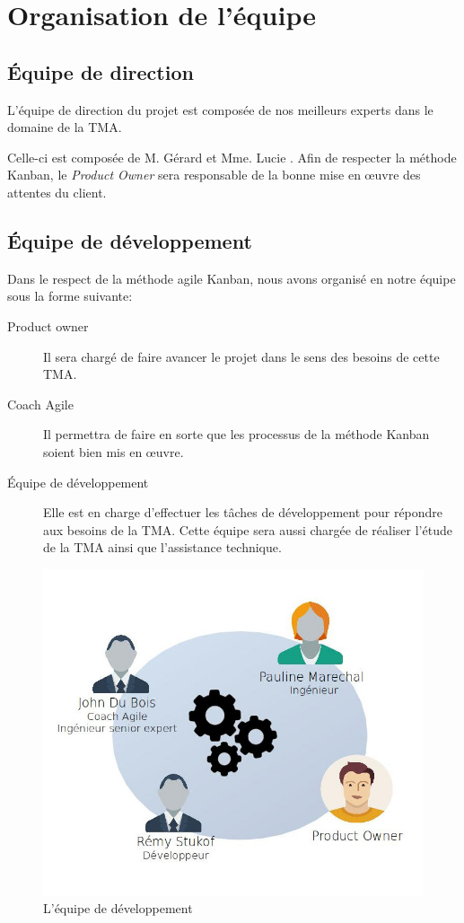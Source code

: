 \section{Organisation de l'équipe}
	\subsection{Équipe de direction}
	L’équipe de direction du projet est composée de nos meilleurs experts dans le domaine de la TMA. 

	Celle-ci est composée de M. Gérard  et Mme. Lucie . Afin de respecter la méthode Kanban, le \textit{Product Owner} sera responsable de la bonne mise en œuvre des attentes du client.
	
	\subsection{Équipe de développement}
	Dans le respect de la méthode agile Kanban, nous avons organisé en notre équipe sous la forme suivante:
	
	\begin{description}
		\item[Product owner]  Il sera chargé de faire avancer le projet dans le sens des besoins de cette TMA.
		\item[Coach Agile]  Il permettra de faire en sorte que les processus de la méthode Kanban soient bien mis en œuvre. 
		\item[Équipe de développement] Elle est en charge d’effectuer les tâches de développement pour répondre aux besoins de la TMA. Cette équipe sera aussi chargée de réaliser l’étude de la TMA ainsi que l’assistance technique. 		
	\end{description}
		
\begin{figure}[H]
\centering
\includegraphics[width=0.7\linewidth]{images/chap2/team}
\caption{L'équipe de développement}
\label{fig:team}
\end{figure}
